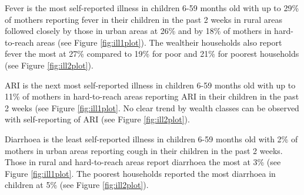 \documentclass[12pt,a4paper]{article}
\begin{document}
Fever is the most self-reported illness in children 6-59 months old with up to 29\% of mothers reporting fever in their children in the past 2 weeks in rural areas followed closely by those in urban areas at 26\% and by 18\% of mothers in hard-to-reach areas (see Figure \ref{fig:ill1plot}). The wealtheir households also report fever the most at 27\% compared to 19\% for poor and 21\% for poorest households (see Figure \ref{fig:ill2plot}).

ARI is the next most self-reported illness in children 6-59 months old with up to 11\% of mothers in hard-to-reach areas reporting ARI in their children in the past 2 weeks (see Figure \ref{fig:ill1plot}. No clear trend by wealth classes can be observed with self-reporting of ARI (see Figure \ref{fig:ill2plot}).

Diarrhoea is the least self-reported illness in children 6-59 months old with 2\% of mothers in urban areas reporting cough in their children in the past 2 weeks. Those in rural and hard-to-reach areas report diarrhoea the most at 3\% (see Figure \ref{fig:ill1plot}. The poorest households reported the most diarrhoea in children at 5\% (see Figure \ref{fig:ill2plot}).
\end{document}
